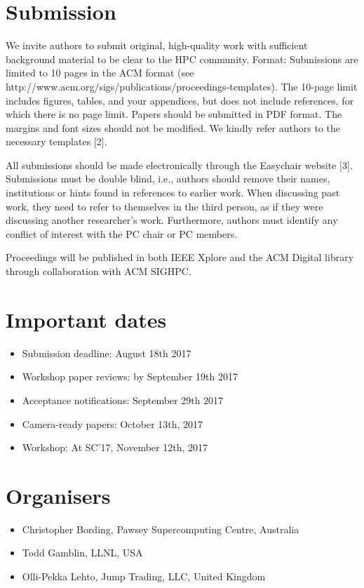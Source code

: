 \documentclass[11pt,a4paper]{article}
\begin{document}
\section{Submission}

We invite authors to submit original, high-quality work with
sufficient background material to be clear to the HPC
community. 
Format: Submissions are limited to 10 pages in the ACM format 
(see http://www.acm.org/sigs/publications/proceedings-templates). 
The 10-page limit includes figures, tables, and your appendices, 
but does not include references, for which there is no page limit. 
Papers should be submitted in PDF format. The margins and font sizes 
should not be modified. We kindly refer authors to the necessary templates [2].

All submissions should be made electronically through the Easychair
website [3].  Submissions must be double blind, i.e., authors should
remove their names, institutions or hints found in references to
earlier work. When discussing past work, they need to refer to
themselves in the third person, as if they were discussing another
researcher's work. Furthermore, authors must identify any conflict of
interest with the PC chair or PC members.

Proceedings will be published in both IEEE Xplore and the ACM Digital
library through collaboration with ACM SIGHPC.

\section{Important dates}
\begin{itemize}
\item Submission deadline: August 18th 2017
\item Workshop paper reviews: by September 19th 2017
\item Acceptance notifications: September 29th 2017
\item Camera-ready papers: October 13th, 2017
\item Workshop: At SC'17, November 12th, 2017
\end{itemize}

\section{Organisers}

\begin{itemize}
\item Christopher Bording, Pawsey Supercomputing Centre, Australia
\item Todd Gamblin, LLNL, USA
\item Olli-Pekka Lehto, Jump Trading, LLC, United Kingdom
\end{itemize}
\end{document}
